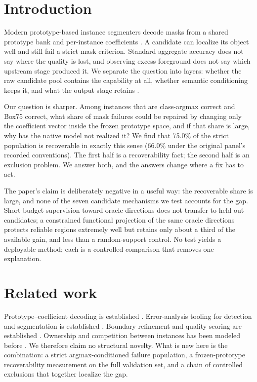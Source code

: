 ﻿\documentclass[times,twocolumn,final,authoryear]{elsarticle}
\begin{document}
\section{Introduction}
Modern prototype-based instance segmenters decode masks from a shared prototype bank and per-instance
coefficients \citep{bolya2019yolact}. A candidate can localize its object well and still fail a strict
mask criterion. Standard aggregate accuracy does not say where the quality is lost, and observing
excess foreground does not say which upstream stage produced it. We separate the question into
layers: whether the raw candidate pool contains the capability at all, whether semantic
conditioning keeps it, and what the output stage retains \citep{bolya2020tide}.

Our question is sharper. Among instances that are class-argmax correct and Box75 correct, what share
of mask failures could be repaired by changing only the coefficient vector inside the frozen
prototype space, and if that share is large, why has the native model not realized it? We find
that 75.0\% of the strict population is recoverable in exactly this sense (66.0\% under the original
panel's recorded conventions). The first half is a recoverability fact; the second half is an
exclusion problem. We answer both, and the answers change where a fix has to act.

The paper's claim is deliberately negative in a useful way: the recoverable share is large, and
none of the seven candidate mechanisms we test accounts for the gap. Short-budget supervision
toward oracle directions does not transfer to held-out candidates; a constrained functional
projection of the same oracle directions protects reliable regions extremely well but retains only
about a third of the available gain, and less than a random-support control. No test yields a
deployable method; each is a controlled comparison that removes one explanation.

\section{Related work}
Prototype--coefficient decoding is established \citep{bolya2019yolact}. Error-analysis tooling for
detection and segmentation is established \citep{bolya2020tide}. Boundary refinement and quality
scoring are established \citep{kirillov2020pointrend,tang2021bpr,huang2019maskscoring,ke2022transfiner}.
Ownership and competition between instances has been modeled before \citep{ke2021bcnet}.
We therefore claim no structural novelty. What is new here is the combination: a strict
argmax-conditioned failure population, a frozen-prototype recoverability measurement on the full
validation set, and a chain of controlled exclusions that together localize the gap.
\end{document}

